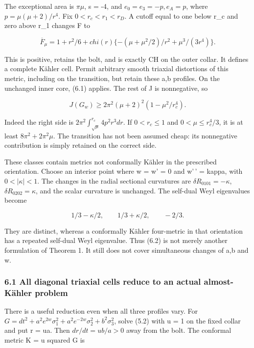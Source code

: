 \documentclass[
  10pt,
]{article}
\begin{document}
The exceptional area is \(\pi\mu\), s = -4, and \(e_0=e_3=-p,e_A=p\),
where \(p=\mu(\mu+2)/r^4\). Fix \(0<r_c<r_1<r_D\). A cutoff equal to one
below r\_c and zero above r\_1 changes F to

\[
 \overline F_\mu=1+r^2/6+chi(r)
                  \{- (\mu+\mu^2/2)/r^2+\mu^3/(3r^4)\}.
\]

This is positive, retains the bolt, and is exactly CH on the outer
collar. It defines a complete Kähler cell. Permit arbitrary smooth
triaxial distortions of this metric, including on the transition, but
retain these a,b profiles. On the unchanged inner core, (6.1) applies.
The rest of J is nonnegative, so

\[
 \boxed{J(G_w)\ge2\pi^2(\mu+2)^2(1-\mu^2/r_c^4).}               \tag{6.2}
\]

Indeed the right side is \(2\pi^2\int_{\sqrt\mu}^{r_c}4p^2r^3dr\). If
\(0<r_c\le1\) and \(0<\mu\le r_c^4/3\), it is at least
\(8\pi^2+2\pi^2\mu\). The transition has not been assumed cheap: its
nonnegative contribution is simply retained on the correct side.

These classes contain metrics not conformally Kähler in the prescribed
orientation. Choose an interior point where w = w' = 0 and w'\,' =
kappa, with \(0<|\kappa|<1\). The changes in the radial sectional
curvatures are \(\delta R_{0101}=-\kappa\), \(\delta R_{0202}=\kappa\),
and the scalar curvature is unchanged. The self-dual Weyl eigenvalues
become

\[
       1/3-\kappa/2,\qquad 1/3+\kappa/2,\qquad -2/3.
\]

They are distinct, whereas a conformally Kähler four-metric in that
orientation has a repeated self-dual Weyl eigenvalue. Thus (6.2) is not
merely another formulation of Theorem 1. It still does not cover
simultaneous changes of a,b and w.

\hypertarget{all-diagonal-triaxial-cells-reduce-to-an-actual-almost-kuxe4hler-problem}{%
\subsubsection{6.1 All diagonal triaxial cells reduce to an actual
almost-Kähler
problem}\label{all-diagonal-triaxial-cells-reduce-to-an-actual-almost-kuxe4hler-problem}}

There is a useful reduction even when all three profiles vary. For
\(G=dt^2+a^2e^{2w}\sigma_1^2+a^2e^{-2w}\sigma_2^2+b^2\sigma_3^2\), solve
(5.2) with u = 1 on the fixed collar and put r = ua. Then
\(dr/dt=ub/a>0\) away from the bolt. The conformal metric K = u squared
G is
\end{document}
